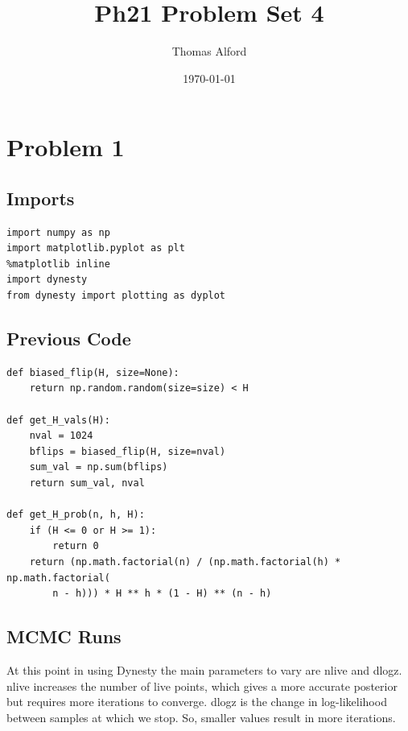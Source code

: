 \documentclass[11pt]{article}
\author{Thomas Alford}
\date{\today}
\title{Ph21 Problem Set 4}
\begin{document}
\maketitle
\section*{Problem 1}
\label{sec-1}
\subsection*{Imports}
\label{sec-1-1}
\begin{verbatim}
import numpy as np
import matplotlib.pyplot as plt
%matplotlib inline
import dynesty
from dynesty import plotting as dyplot
\end{verbatim}

\subsection*{Previous Code}
\label{sec-1-2}

\begin{verbatim}
def biased_flip(H, size=None):
    return np.random.random(size=size) < H

def get_H_vals(H):
    nval = 1024
    bflips = biased_flip(H, size=nval)
    sum_val = np.sum(bflips)
    return sum_val, nval

def get_H_prob(n, h, H):
    if (H <= 0 or H >= 1):
        return 0
    return (np.math.factorial(n) / (np.math.factorial(h) * np.math.factorial(
        n - h))) * H ** h * (1 - H) ** (n - h)
\end{verbatim}

\subsection*{MCMC Runs}
\label{sec-1-3}

At this point in using Dynesty the main parameters to vary are nlive and
dlogz. nlive increases the number of live points, which gives a more accurate
posterior but requires more iterations to converge. dlogz is the change in
log-likelihood between samples at which we stop. So, smaller values result in
more iterations.
\end{document}
